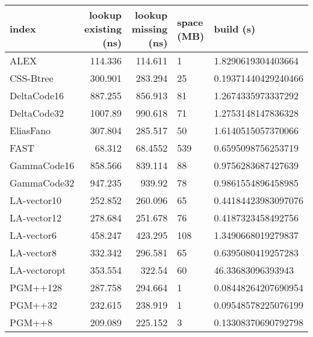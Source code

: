 \begin{tabular}{lrrll}
\hline
 index             &   lookup existing (ns) &   lookup missing (ns) & space (MB)   & build (s)             \\
\hline
 ALEX              &               114.336  &              114.611  & 1            & 1.8290619304403664    \\
 CSS-Btree         &               300.901  &              283.294  & 25           & 0.19371440429240466   \\
 DeltaCode16       &               887.255  &              856.913  & 81           & 1.2674335973337292    \\
 DeltaCode32       &              1007.89   &              990.618  & 71           & 1.2753148147836328    \\
 EliasFano         &               307.804  &              285.517  & 50           & 1.6140515057370066    \\
 FAST              &                68.312  &               68.4552 & 539          & 0.6595098756253719    \\
 GammaCode16       &               858.566  &              839.114  & 88           & 0.9756283687427639    \\
 GammaCode32       &               947.235  &              939.92   & 78           & 0.9861554896458985    \\
 LA-vector10       &               252.852  &              260.096  & 65           & 0.44184423983097076   \\
 LA-vector12       &               278.684  &              251.678  & 76           & 0.4187323458492756    \\
 LA-vector6        &               458.247  &              423.295  & 108          & 1.3490668019279837    \\
 LA-vector8        &               332.342  &              296.581  & 65           & 0.6395080419257283    \\
 LA-vectoropt      &               353.554  &              322.54   & 60           & 46.33683096393943     \\
 PGM++128          &               287.758  &              294.664  & 1            & 0.08448264207690954   \\
 PGM++32           &               232.615  &              238.919  & 1            & 0.09548578225076199   \\
 PGM++8            &               209.089  &              225.152  & 3            & 0.13308370690792798   \\

\end{tabular}
